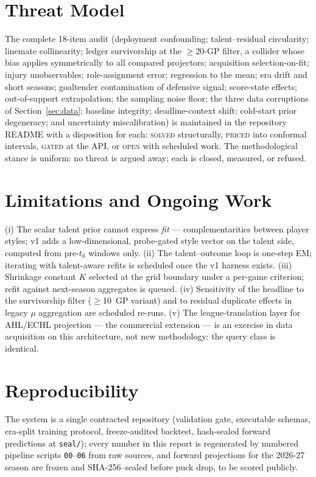 \documentclass[11pt]{article}
\begin{document}
\section{Threat Model}\label{sec:threats}

The complete 18-item audit (deployment confounding; talent--residual circularity; linemate
collinearity; ledger survivorship at the $\ge$20-GP filter, a collider whose bias applies
symmetrically to all compared projectors; acquisition selection-on-fit; injury
unobservables; role-assignment error; regression to the mean; era drift and short seasons;
goaltender contamination of defensive signal; score-state effects; out-of-support
extrapolation; the sampling noise floor; the three data corruptions of
Section~\ref{sec:data}; baseline integrity; deadline-context shift; cold-start prior
degeneracy; and uncertainty miscalibration) is maintained in the repository README with a
disposition for each: \textsc{solved} structurally, \textsc{priced} into conformal
intervals, \textsc{gated} at the API, or \textsc{open} with scheduled work. The
methodological stance is uniform: no threat is argued away; each is closed, measured, or
refused.

\section{Limitations and Ongoing Work}

(i) The scalar talent prior cannot express \emph{fit} --- complementarities between player
styles; v1 adds a low-dimensional, probe-gated style vector on the talent side, computed
from pre-$t_0$ windows only. (ii) The talent--outcome loop is one-step EM; iterating with
talent-aware refits is scheduled once the v1 harness exists. (iii) Shrinkage constant $K$
selected at the grid boundary under a per-game criterion; refit against next-season
aggregates is queued. (iv) Sensitivity of the headline to the survivorship filter
($\ge$10~GP variant) and to residual duplicate effects in legacy $\mu$ aggregation are
scheduled re-runs. (v) The league-translation layer for AHL/ECHL projection --- the
commercial extension --- is an exercise in data acquisition on this architecture, not new
methodology: the query class is identical.

\section*{Reproducibility}

The system is a single contracted repository (validation gate, executable schemas,
era-split training protocol, freeze-audited backtest, hash-sealed forward predictions at
\texttt{seal/}); every number in this report is regenerated by numbered pipeline scripts
\texttt{00}--\texttt{06} from raw sources, and forward projections for the 2026-27 season
are frozen and SHA-256--sealed before puck drop, to be scored publicly.
\end{document}

